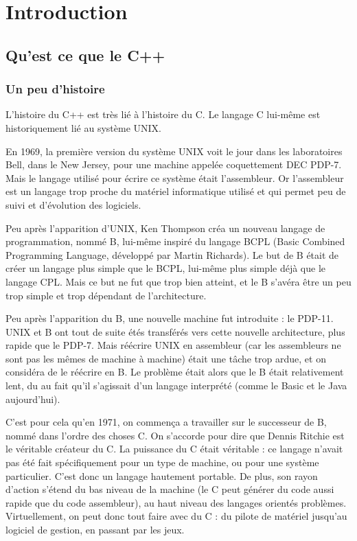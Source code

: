 \chapter{Introduction}

\section{Qu'est ce que le C++}

\subsection{Un peu d'histoire}

L'histoire du C++ est très lié à l'histoire du C. Le langage C lui-même est historiquement lié au système UNIX.

En 1969, la première version du système UNIX voit le jour dans les laboratoires Bell, dans le New Jersey, pour une machine appelée coquettement DEC PDP-7. Mais le langage utilisé pour écrire ce système était l'assembleur. Or l'assembleur est un langage trop proche du matériel informatique utilisé et qui permet peu de suivi et d'évolution des logiciels.

Peu après l'apparition d'UNIX, Ken Thompson créa un nouveau langage de programmation, nommé B, lui-même inspiré du langage BCPL (Basic Combined Programming Language, développé par Martin Richards). Le but de B était de créer un langage plus simple que le BCPL, lui-même plus simple déjà que le langage CPL. Mais ce but ne fut que trop bien atteint, et le B s'avéra être un peu trop simple et trop dépendant de l'architecture.

Peu après l'apparition du B, une nouvelle machine fut introduite : le PDP-11. UNIX et B ont tout de suite étés transférés vers cette nouvelle architecture, plus rapide que le PDP-7. Mais réécrire UNIX en assembleur (car les assembleurs ne sont pas les mêmes de machine à machine) était une tâche trop ardue, et on considéra de le réécrire en B. Le problème était alors que le B était relativement lent, du au fait qu'il s'agissait d'un langage interprété (comme le Basic et le Java aujourd'hui).

C'est pour cela qu'en 1971, on commença a travailler sur le successeur de B, nommé dans l'ordre des choses C. On s'accorde pour dire que Dennis Ritchie est le véritable créateur du C. La puissance du C était véritable : ce langage n'avait pas été fait spécifiquement pour un type de machine, ou pour une système particulier. C'est donc un langage hautement portable. De plus, son rayon d'action s'étend du bas niveau de la machine (le C peut générer du code aussi rapide que du code assembleur), au haut niveau des langages orientés problèmes. Virtuellement, on peut donc tout faire avec du C : du pilote de matériel jusqu'au logiciel de gestion, en passant par les jeux.

